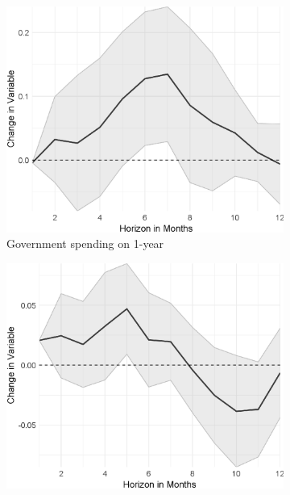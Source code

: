
\begin{figure}[H]
	\centering
	\captionsetup{font=footnotesize}
	\begin{subfigure}{00.32\textwidth}
		\includegraphics[width=1\textwidth]{output/lp/baseline/bHP/government_spending/government_spendingonexpectations1y_djn.eps}
		\caption{Government spending on 1-year}
	\end{subfigure}
	\begin{subfigure}{00.32\textwidth}
		\includegraphics[width=1\textwidth]{output/lp/baseline/bHP/monetary_policy/monetary_policyonexpectations3y_djn.eps}

\end{subfigure}
\end{figure}
